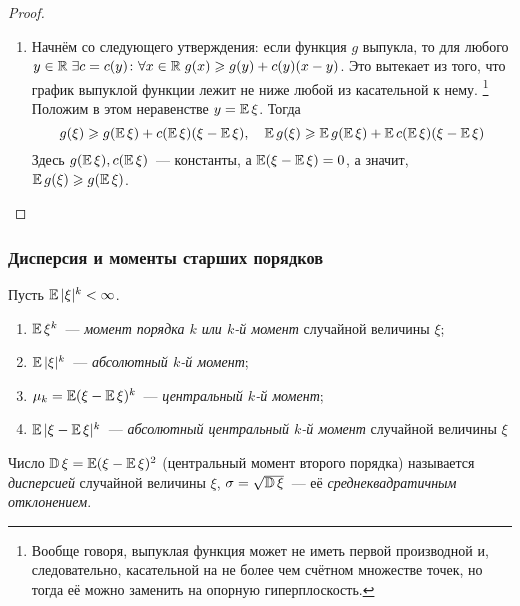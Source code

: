 \begin{proof}
\begin{enumerate}
    \item 
        Начнём со следующего утверждения: если функция $g$ выпукла, то для любого ${y \in \mathbb{R}} \; {\exists c = c(y) \colon} \forall x \in \mathbb{R} \; g(x) \geqslant g(y) + c(y)(x - y)$. Это вытекает из того, что график выпуклой функции лежит не ниже любой из касательной к нему. \footnote{Вообще говоря, выпуклая функция может не иметь первой производной и, следовательно, касательной на не более чем счётном множестве точек, но тогда её можно заменить на опорную гиперплоскость.} Положим в этом неравенстве $y = \operatorname{\mathbb{E}} \xi$. 
        Тогда
        \begin{equation*}
            g(\xi) \geqslant g(\operatorname{\mathbb{E}} \xi) + c(\operatorname{\mathbb{E}} \xi)(\xi - \operatorname{\mathbb{E}} \xi), \quad \operatorname{\mathbb{E}} g(\xi) \geqslant \operatorname{\mathbb{E}} g(\operatorname{\mathbb{E}} \xi) +  \operatorname{\mathbb{E}} c(\operatorname{\mathbb{E}} \xi)(\xi - \operatorname{\mathbb{E}} \xi)
        \end{equation*}
        Здесь $g(\operatorname{\mathbb{E}} \xi), c(\operatorname{\mathbb{E}} \xi)$~--- константы, а $\operatorname{\mathbb{E}} (\xi - \operatorname{\mathbb{E}} \xi) = 0$, а значит, \\ $ \operatorname{\mathbb{E}} g(\xi) \geqslant g(\operatorname{\mathbb{E}} \xi)$.
\end{enumerate}
\end{proof}

\subsubsection{Дисперсия и моменты старших порядков}

\begin{defn}
    Пусть ${\operatorname{\mathbb{E}} |\xi|^k < \infty}$. 
    \begin{enumerate}
        \item 
            ${\operatorname{\mathbb{E}} \xi^k}$~--- \textit{момент порядка $k$ или $k$-й момент} случайной величины $\xi$;
        \item 
            ${\operatorname{\mathbb{E}} |\xi|^k}$~--- \textit{абсолютный $k$-й момент};
        \item 
            $\mu_k = {\operatorname{\mathbb{E}} (\xi - \operatorname{\mathbb{E}} \xi)^k}$~--- \textit{центральный $k$-й момент};
        \item 
            ${\operatorname{\mathbb{E}} |\xi - \operatorname{\mathbb{E}} \xi|^k}$~--- \textit{абсолютный центральный $k$-й момент} случайной величины $\xi$
    \end{enumerate}
\end{defn}

\begin{defn}
    Число $\operatorname{\mathbb{D}}\xi = \operatorname{\mathbb{E}} (\xi - \operatorname{\mathbb{E}} \xi)^2$ (центральный момент второго порядка) называется \textit{дисперсией} случайной величины $\xi$, $\sigma = \sqrt{\operatorname{\mathbb{D}}\xi}$~--- её \textit{среднеквадратичным отклонением}.
\end{defn} 

